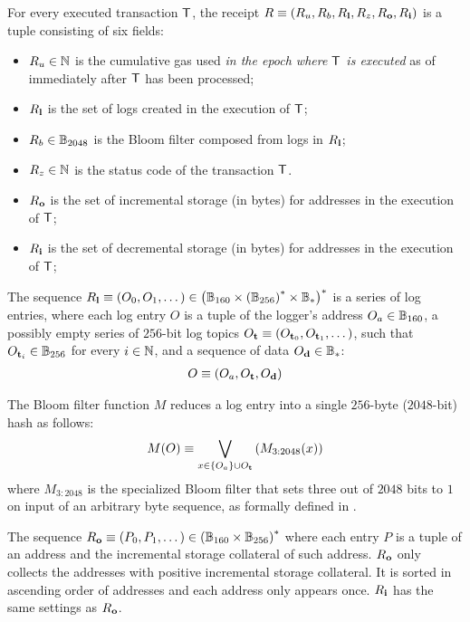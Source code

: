 For every executed transaction $\textsf{T}$, the receipt $R\equiv \left(R_u, R_b, R_{\bf l}, R_z,R_{\bf o},R_{\bf i}\right)$ is a tuple consisting of six fields:
\begin{itemize}[nosep]
	\item $R_u\in\mathbb{N}$ is the cumulative gas used \emph{in the epoch where $\textsf{T}$ is executed} as of immediately after $\textsf{T}$ has been processed;

	\item $R_{\bf l}$ is the set of logs created in the execution of $\textsf{T}$;

	\item $R_b\in\mathbb{B}_{2048}$ is the Bloom filter composed from logs in $R_{\bf l}$;

	\item $R_z\in\mathbb{N}$ is the status code of the transaction $\textsf{T}$.
	
	\item $R_{\bf o}$ is the set of incremental storage (in bytes) for addresses in the execution of $\textsf{T}$;

	\item $R_{\bf i}$ is the set of decremental storage (in bytes) for addresses in the execution of $\textsf{T}$;
\end{itemize}

The sequence $R_{\bf l}\equiv \left(O_0,O_1,\dots\right) \in \left(\mathbb{B}_{160} \times \left(\mathbb{B}_{256}\right)^*\times \mathbb{B}_*\right)^*$ is a series of log entries,
where each log entry $O$ is a tuple of the logger's address $O_a\in \mathbb{B}_{160}$,
a possibly empty series of $256$-bit log topics $O_{\bf t}\equiv \left(O_{{\bf t}_0}, O_{{\bf t}_1},\dots \right)$, such that $O_{{\bf t}_i}\in\mathbb{B}_{256}$ for every $i\in\mathbb{N}$,
and a sequence of data $O_{\bf d}\in\mathbb{B}_*$:
\begin{align}
	O\equiv \left( O_a, O_{\bf t}, O_{\bf d} \right)
\end{align}

The Bloom filter function $M$ reduces a log entry into a single $256$-byte ($2048$-bit) hash as follows:
\begin{align}
 	M(O)\equiv \bigvee_{x\in{\left \{{O_a} \right \}}\cup O_{\bf t}}\left( M_{3:2048}(x) \right)
\end{align} 
where $M_{3:2048}$ is the specialized Bloom filter that sets three out of $2048$ bits to $1$ on input of an arbitrary byte sequence,
as formally defined in \cite{ETH_yellow}.

The sequence $R_{\bf o}\equiv \left(P_0,P_1,\dots\right) \in \left(\mathbb{B}_{160} \times \mathbb{B}_{256}\right)^*$ where each entry $P$ is a tuple of an address and the incremental storage collateral of such address. $R_{\bf o}$ only collects the addresses with positive incremental storage collateral. It is sorted in ascending order of addresses and each address only appears once. $R_{\bf i}$ has the same settings as $R_{\bf o}$.

